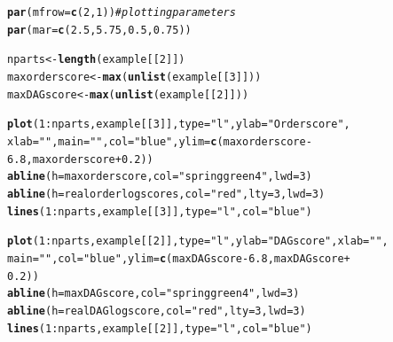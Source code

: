 \documentclass[a4paper]{article}\usepackage[]{graphicx}\usepackage[]{color}
\makeatletter
\newcommand{\hlnum}[1]{\textcolor[rgb]{0.686,0.059,0.569}{#1}}%
\newcommand{\hlstr}[1]{\textcolor[rgb]{0.192,0.494,0.8}{#1}}%
\newcommand{\hlcom}[1]{\textcolor[rgb]{0.678,0.584,0.686}{\textit{#1}}}%
\newcommand{\hlopt}[1]{\textcolor[rgb]{0,0,0}{#1}}%
\newcommand{\hlstd}[1]{\textcolor[rgb]{0.345,0.345,0.345}{#1}}%
\newcommand{\hlkwb}[1]{\textcolor[rgb]{0.69,0.353,0.396}{#1}}%
\newcommand{\hlkwc}[1]{\textcolor[rgb]{0.333,0.667,0.333}{#1}}%
\newcommand{\hlkwd}[1]{\textcolor[rgb]{0.737,0.353,0.396}{\textbf{#1}}}%
\newenvironment{kframe}{%
 \def\at@end@of@kframe{}%
 \ifinner\ifhmode%
  \def\at@end@of@kframe{\end{minipage}}%
  \begin{minipage}{\columnwidth}%
 \fi\fi%
 \def\FrameCommand##1{\hskip\@totalleftmargin \hskip-\fboxsep
 \colorbox{shadecolor}{##1}\hskip-\fboxsep
     \hskip-\linewidth \hskip-\@totalleftmargin \hskip\columnwidth}%
 \MakeFramed {\advance\hsize-\width
   \@totalleftmargin\z@ \linewidth\hsize
   \@setminipage}}%
 {\par\unskip\endMakeFramed%
 \at@end@of@kframe}
\newenvironment{knitrout}{}{} %
\makeatother
\begin{document}
\begin{knitrout}
\color{fgcolor}\begin{kframe}
\begin{alltt}
\hlkwd{par}\hlstd{(}\hlkwc{mfrow} \hlstd{=} \hlkwd{c}\hlstd{(}\hlnum{2}\hlstd{,} \hlnum{1}\hlstd{))}  \hlcom{# plotting parameters}
\hlkwd{par}\hlstd{(}\hlkwc{mar} \hlstd{=} \hlkwd{c}\hlstd{(}\hlnum{2.5}\hlstd{,} \hlnum{5.75}\hlstd{,} \hlnum{0.5}\hlstd{,} \hlnum{0.75}\hlstd{))}

\hlstd{nparts} \hlkwb{<-} \hlkwd{length}\hlstd{(example[[}\hlnum{2}\hlstd{]])}
\hlstd{maxorderscore} \hlkwb{<-} \hlkwd{max}\hlstd{(}\hlkwd{unlist}\hlstd{(example[[}\hlnum{3}\hlstd{]]))}
\hlstd{maxDAGscore} \hlkwb{<-} \hlkwd{max}\hlstd{(}\hlkwd{unlist}\hlstd{(example[[}\hlnum{2}\hlstd{]]))}

\hlkwd{plot}\hlstd{(}\hlnum{1}\hlopt{:}\hlstd{nparts, example[[}\hlnum{3}\hlstd{]],} \hlkwc{type} \hlstd{=} \hlstr{"l"}\hlstd{,} \hlkwc{ylab} \hlstd{=} \hlstr{"Order score"}\hlstd{,}
    \hlkwc{xlab} \hlstd{=} \hlstr{""}\hlstd{,} \hlkwc{main} \hlstd{=} \hlstr{""}\hlstd{,} \hlkwc{col} \hlstd{=} \hlstr{"blue"}\hlstd{,} \hlkwc{ylim} \hlstd{=} \hlkwd{c}\hlstd{(maxorderscore} \hlopt{-}
        \hlnum{6.8}\hlstd{, maxorderscore} \hlopt{+} \hlnum{0.2}\hlstd{))}
\hlkwd{abline}\hlstd{(}\hlkwc{h} \hlstd{= maxorderscore,} \hlkwc{col} \hlstd{=} \hlstr{"springgreen4"}\hlstd{,} \hlkwc{lwd} \hlstd{=} \hlnum{3}\hlstd{)}
\hlkwd{abline}\hlstd{(}\hlkwc{h} \hlstd{= realorderlogscores,} \hlkwc{col} \hlstd{=} \hlstr{"red"}\hlstd{,} \hlkwc{lty} \hlstd{=} \hlnum{3}\hlstd{,} \hlkwc{lwd} \hlstd{=} \hlnum{3}\hlstd{)}
\hlkwd{lines}\hlstd{(}\hlnum{1}\hlopt{:}\hlstd{nparts, example[[}\hlnum{3}\hlstd{]],} \hlkwc{type} \hlstd{=} \hlstr{"l"}\hlstd{,} \hlkwc{col} \hlstd{=} \hlstr{"blue"}\hlstd{)}

\hlkwd{plot}\hlstd{(}\hlnum{1}\hlopt{:}\hlstd{nparts, example[[}\hlnum{2}\hlstd{]],} \hlkwc{type} \hlstd{=} \hlstr{"l"}\hlstd{,} \hlkwc{ylab} \hlstd{=} \hlstr{"DAG score"}\hlstd{,} \hlkwc{xlab} \hlstd{=} \hlstr{""}\hlstd{,}
    \hlkwc{main} \hlstd{=} \hlstr{""}\hlstd{,} \hlkwc{col} \hlstd{=} \hlstr{"blue"}\hlstd{,} \hlkwc{ylim} \hlstd{=} \hlkwd{c}\hlstd{(maxDAGscore} \hlopt{-} \hlnum{6.8}\hlstd{, maxDAGscore} \hlopt{+}
        \hlnum{0.2}\hlstd{))}
\hlkwd{abline}\hlstd{(}\hlkwc{h} \hlstd{= maxDAGscore,} \hlkwc{col} \hlstd{=} \hlstr{"springgreen4"}\hlstd{,} \hlkwc{lwd} \hlstd{=} \hlnum{3}\hlstd{)}
\hlkwd{abline}\hlstd{(}\hlkwc{h} \hlstd{= realDAGlogscore,} \hlkwc{col} \hlstd{=} \hlstr{"red"}\hlstd{,} \hlkwc{lty} \hlstd{=} \hlnum{3}\hlstd{,} \hlkwc{lwd} \hlstd{=} \hlnum{3}\hlstd{)}
\hlkwd{lines}\hlstd{(}\hlnum{1}\hlopt{:}\hlstd{nparts, example[[}\hlnum{2}\hlstd{]],} \hlkwc{type} \hlstd{=} \hlstr{"l"}\hlstd{,} \hlkwc{col} \hlstd{=} \hlstr{"blue"}\hlstd{)}
\end{alltt}
\end{kframe}


\end{knitrout}
\end{document}

